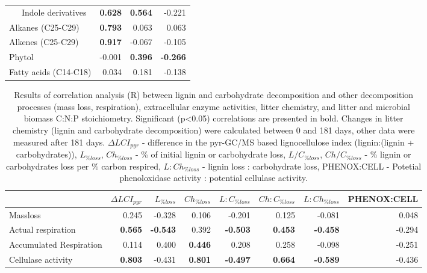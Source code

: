\documentclass[10pt]{article}
\begin{document}
\begin{flushleft}
\begin{table}[h!]
{\begin{tabular}{lrrr}
  \ \ \ Indole derivatives & \textbf{ 0.628 } & \textbf{ 0.564 } & -0.221 \\ 
  Alkanes (C25-C29) & \textbf{ 0.793 } & 0.063 & 0.063 \\ 
  Alkenes (C25-C29) & \textbf{ 0.917 } & -0.067 & -0.105 \\ 
  Phytol & -0.001 & \textbf{ 0.396 } & \textbf{ -0.266 } \\ 
  Fatty acids (C14-C18) & 0.034 & 0.181 & -0.138 \\ 
   \hline
\end{tabular}
}
\end{table}


\begin{landscape}

\begin{table}[h!]
\centering
\caption{Results of correlation analysis (R) between lignin and carbohydrate decomposition and other decomposition processes (mass loss, respiration), extracellular enzyme activities, litter chemistry, and litter and microbial biomass C:N:P stoichiometry. Significant (p\textless 0.05) correlations are presented in bold. Changes in litter chemistry (lignin and carbohydrate decomposition) were calculated between 0 and 181 days, other data were measured after 181 days. $\Delta LCI_{pyr}$ - difference in the pyr-GC/MS based lignocellulose index (lignin:(lignin + carbohydrates)), $L_{\%loss}$, $Ch_{\%loss}$ - \% of initial lignin or carbohydrate loss, $L/C_{\%loss}$, $Ch/C_{\%loss}$  - \% lignin or carbohydrates loss per \% carbon respired, $L:Ch_{\%loss}$ - lignin loss : carbohydrate loss, PHENOX:CELL - Potetial phenoloxidase activity : potential cellulase activity.} 
\label{corrtable}
{\small
\begin{tabular}{lrrrrrrr}
  \hline
 & $\Delta LCI_{pyr}$ & $L_{\%loss}$ & $Ch_{\%loss}$ & $L:C_{\%loss}$ & $Ch:C_{\%loss}$ & $L:Ch_{\%loss}$ & PHENOX:CELL \\ 
  \hline
Massloss & 0.245 & -0.328 & 0.106 & -0.201 & 0.125 & -0.081 & 0.048 \\ 
  Actual respiration & \textbf{ 0.565 } & \textbf{ -0.543 } & 0.392 & \textbf{ -0.503 } & \textbf{ 0.453 } & \textbf{ -0.458 } & -0.294 \\ 
  Accumulated Respiration & 0.114 & 0.400 & \textbf{ 0.446 } & 0.208 & 0.258 & -0.098 & -0.251 \\ 
  Cellulase activity & \textbf{ 0.803 } & -0.431 & \textbf{ 0.801 } & \textbf{ -0.497 } & \textbf{ 0.664 } & \textbf{ -0.589 } & -0.436 \\ 

\end{tabular}}
\end{table}
\end{landscape}
\end{flushleft}
\end{document}
